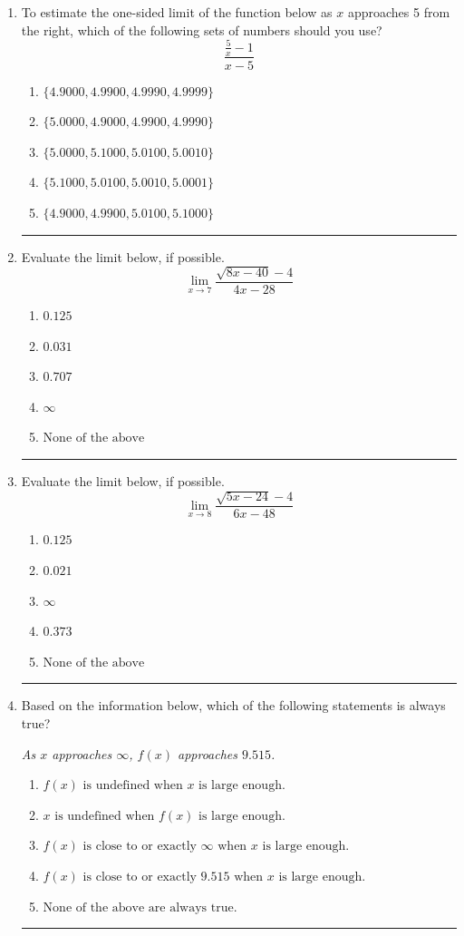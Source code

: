 \documentclass[14pt]{extbook}
\newcommand{\litem}[1]{\item#1\hspace*{-1cm}\rule{\textwidth}{0.4pt}}
\begin{document}
\begin{enumerate}
{\begin{enumerate}[label=\Alph*.]
\end{enumerate} }
\litem{
To estimate the one-sided limit of the function below as $x$ approaches 5 from the right, which of the following sets of numbers should you use?\[ \frac{\frac{5}{x} - 1}{x - 5} \]\begin{enumerate}[label=\Alph*.]
\item \( \{ 4.9000, 4.9900, 4.9990, 4.9999 \} \)
\item \( \{ 5.0000, 4.9000, 4.9900, 4.9990 \} \)
\item \( \{ 5.0000, 5.1000, 5.0100, 5.0010 \} \)
\item \( \{ 5.1000, 5.0100, 5.0010, 5.0001 \} \)
\item \( \{ 4.9000, 4.9900, 5.0100, 5.1000 \} \)

\end{enumerate} }
\litem{
Evaluate the limit below, if possible.\[ \lim_{x \rightarrow 7} \frac{\sqrt{8x - 40} - 4}{4x - 28} \]\begin{enumerate}[label=\Alph*.]
\item \( 0.125 \)
\item \( 0.031 \)
\item \( 0.707 \)
\item \( \infty \)
\item \( \text{None of the above} \)

\end{enumerate} }
\litem{
Evaluate the limit below, if possible.\[ \lim_{x \rightarrow 8} \frac{\sqrt{5x - 24} - 4}{6x - 48} \]\begin{enumerate}[label=\Alph*.]
\item \( 0.125 \)
\item \( 0.021 \)
\item \( \infty \)
\item \( 0.373 \)
\item \( \text{None of the above} \)

\end{enumerate} }
\litem{
Based on the information below, which of the following statements is always true?
\begin{center}
    \textit{ As $x$ approaches $\infty$, $f(x)$ approaches $9.515$. }
\end{center}
\begin{enumerate}[label=\Alph*.]
\item \( f(x) \text{ is undefined when } x \text{ is large enough}. \)
\item \( x \text{ is undefined when } f(x) \text{ is large enough}. \)
\item \( f(x) \text{ is close to or exactly } \infty \text{ when } x \text{ is large enough}. \)
\item \( f(x) \text{ is close to or exactly } 9.515 \text{ when } x \text{ is large enough}. \)
\item \( \text{None of the above are always true.} \)


\end{enumerate}}
\end{enumerate}
\end{document}
